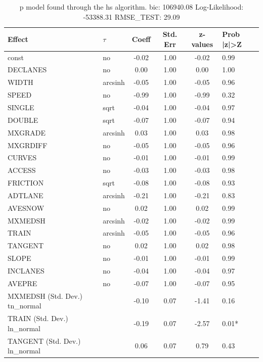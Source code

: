 \begin{table}
	\caption{p model found through the hs algorithm. bic: 106940.08 Log-Likelihood: -53388.31 RMSE_TEST: 29.09}
	\begin{center}
		\begin{tabular}{|l|l|c|c|c|l|}
			\hline
			Effect & $\tau$ & Coeff & Std. Err & z-values & Prob |z|>Z \\
			\hline
			const & no & -0.02 & 1.00 & -0.02 & 0.99 \\
			\hline
			DECLANES & no & 0.00 & 1.00 & 0.00 & 1.00 \\
			\hline
			WIDTH & arcsinh & -0.05 & 1.00 & -0.05 & 0.96 \\
			\hline
			SPEED & no & -0.99 & 1.00 & -0.99 & 0.32 \\
			\hline
			SINGLE & sqrt & -0.04 & 1.00 & -0.04 & 0.97 \\
			\hline
			DOUBLE & sqrt & -0.07 & 1.00 & -0.07 & 0.94 \\
			\hline
			MXGRADE & arcsinh & 0.03 & 1.00 & 0.03 & 0.98 \\
			\hline
			MXGRDIFF & no & -0.05 & 1.00 & -0.05 & 0.96 \\
			\hline
			CURVES & no & -0.01 & 1.00 & -0.01 & 0.99 \\
			\hline
			ACCESS & no & -0.03 & 1.00 & -0.03 & 0.98 \\
			\hline
			FRICTION & sqrt & -0.08 & 1.00 & -0.08 & 0.93 \\
			\hline
			ADTLANE & arcsinh & -0.21 & 1.00 & -0.21 & 0.83 \\
			\hline
			AVESNOW & no & 0.02 & 1.00 & 0.02 & 0.99 \\
			\hline
			MXMEDSH & arcsinh & -0.02 & 1.00 & -0.02 & 0.99 \\
			\hline
			TRAIN & arcsinh & -0.05 & 1.00 & -0.05 & 0.96 \\
			\hline
			TANGENT & no & 0.02 & 1.00 & 0.02 & 0.98 \\
			\hline
			SLOPE & no & -0.01 & 1.00 & -0.01 & 0.99 \\
			\hline
			INCLANES & no & -0.04 & 1.00 & -0.04 & 0.97 \\
			\hline
			AVEPRE & no & -0.07 & 1.00 & -0.07 & 0.95 \\
			\hline
			MXMEDSH (Std. Dev.) tn_normal &  & -0.10 & 0.07 & -1.41 & 0.16 \\
			\hline
			TRAIN (Std. Dev.) ln_normal &  & -0.19 & 0.07 & -2.57 & 0.01* \\
			\hline
			TANGENT (Std. Dev.) ln_normal &  & 0.06 & 0.07 & 0.79 & 0.43 \\

\end{tabular}
\end{center}
\end{table}
